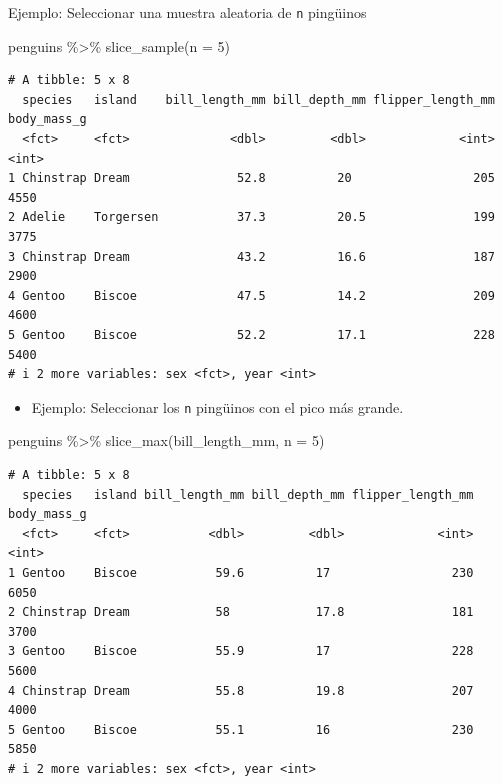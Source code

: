 \documentclass[
  letterpaper,
  DIV=11,
  numbers=noendperiod]{scrreprt}
\newenvironment{Shaded}{\begin{snugshade}}{\end{snugshade}}
\newcommand{\AttributeTok}[1]{\textcolor[rgb]{0.40,0.45,0.13}{#1}}
\newcommand{\DecValTok}[1]{\textcolor[rgb]{0.68,0.00,0.00}{#1}}
\newcommand{\FunctionTok}[1]{\textcolor[rgb]{0.28,0.35,0.67}{#1}}
\newcommand{\NormalTok}[1]{\textcolor[rgb]{0.00,0.23,0.31}{#1}}
\newcommand{\SpecialCharTok}[1]{\textcolor[rgb]{0.37,0.37,0.37}{#1}}
\providecommand{\tightlist}{%
  \setlength{\itemsep}{0pt}\setlength{\parskip}{0pt}}\usepackage{longtable,booktabs,array}
\begin{document}
{Ejemplo}: Seleccionar una muestra aleatoria de \texttt{n} pingüinos

\begin{Shaded}
\begin{Highlighting}[]
\NormalTok{penguins }\SpecialCharTok{\%\textgreater{}\%} 
  \FunctionTok{slice\_sample}\NormalTok{(}\AttributeTok{n =} \DecValTok{5}\NormalTok{)}
\end{Highlighting}
\end{Shaded}

\begin{verbatim}
# A tibble: 5 x 8
  species   island    bill_length_mm bill_depth_mm flipper_length_mm body_mass_g
  <fct>     <fct>              <dbl>         <dbl>             <int>       <int>
1 Chinstrap Dream               52.8          20                 205        4550
2 Adelie    Torgersen           37.3          20.5               199        3775
3 Chinstrap Dream               43.2          16.6               187        2900
4 Gentoo    Biscoe              47.5          14.2               209        4600
5 Gentoo    Biscoe              52.2          17.1               228        5400
# i 2 more variables: sex <fct>, year <int>
\end{verbatim}

\begin{itemize}
\tightlist
\item
  {Ejemplo}: Seleccionar los \texttt{n} pingüinos con el pico más
  grande.
\end{itemize}

\begin{Shaded}
\begin{Highlighting}[]
\NormalTok{penguins }\SpecialCharTok{\%\textgreater{}\%} 
  \FunctionTok{slice\_max}\NormalTok{(bill\_length\_mm, }\AttributeTok{n =} \DecValTok{5}\NormalTok{)}
\end{Highlighting}
\end{Shaded}

\begin{verbatim}
# A tibble: 5 x 8
  species   island bill_length_mm bill_depth_mm flipper_length_mm body_mass_g
  <fct>     <fct>           <dbl>         <dbl>             <int>       <int>
1 Gentoo    Biscoe           59.6          17                 230        6050
2 Chinstrap Dream            58            17.8               181        3700
3 Gentoo    Biscoe           55.9          17                 228        5600
4 Chinstrap Dream            55.8          19.8               207        4000
5 Gentoo    Biscoe           55.1          16                 230        5850
# i 2 more variables: sex <fct>, year <int>
\end{verbatim}
\end{document}
